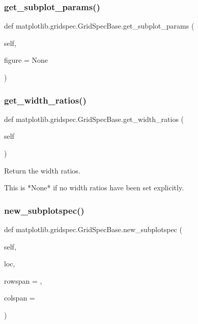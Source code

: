 \subsubsection{\texorpdfstring{get\+\_\+subplot\+\_\+params()}{get\_subplot\_params()}}
{\footnotesize\ttfamily def matplotlib.\+gridspec.\+Grid\+Spec\+Base.\+get\+\_\+subplot\+\_\+params (\begin{DoxyParamCaption}\item[{}]{self,  }\item[{}]{figure = {\ttfamily None} }\end{DoxyParamCaption})}

\mbox{\label{classmatplotlib_1_1gridspec_1_1GridSpecBase_ab75773e6b14e1aa2afb5d0ab88ca019e}} 
\subsubsection{\texorpdfstring{get\+\_\+width\+\_\+ratios()}{get\_width\_ratios()}}
{\footnotesize\ttfamily def matplotlib.\+gridspec.\+Grid\+Spec\+Base.\+get\+\_\+width\+\_\+ratios (\begin{DoxyParamCaption}\item[{}]{self }\end{DoxyParamCaption})}

\begin{DoxyVerb}Return the width ratios.

This is *None* if no width ratios have been set explicitly.
\end{DoxyVerb}
 \mbox{\label{classmatplotlib_1_1gridspec_1_1GridSpecBase_a371e095a03c211ee7b141a2c698484fc}} 
\subsubsection{\texorpdfstring{new\+\_\+subplotspec()}{new\_subplotspec()}}
{\footnotesize\ttfamily def matplotlib.\+gridspec.\+Grid\+Spec\+Base.\+new\+\_\+subplotspec (\begin{DoxyParamCaption}\item[{}]{self,  }\item[{}]{loc,  }\item[{}]{rowspan = {},  }\item[{}]{colspan = {} }\end{DoxyParamCaption})}

